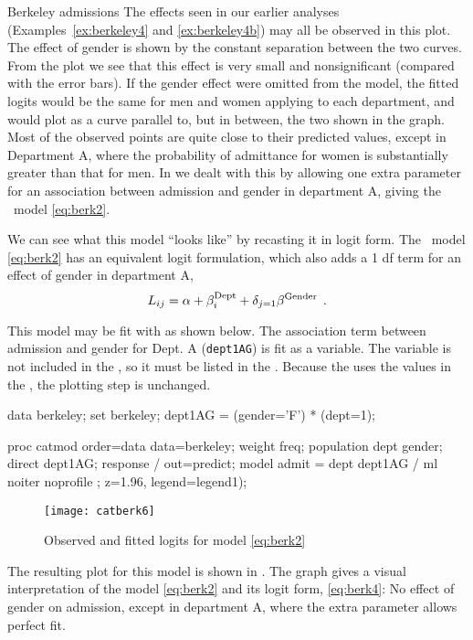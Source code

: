 \begin{Example}[berkeley8]{Berkeley admissions}
The effects seen in our earlier analyses (Examples~\ref{ex:berkeley4}
and \ref{ex:berkeley4b})
may all be observed in this
plot.
The effect of gender is shown by the constant separation
between the two curves.
From the plot we see that this effect is very small and nonsignificant (compared
with the error bars).
If the gender effect were omitted from the model,
the fitted logits would be the same
for men and women applying to each department, and would plot as a curve
parallel to, but in between, the two shown in the graph.
Most of the observed points are quite close to their predicted values,
except in Department A,
where the probability of admittance for women is substantially
greater than that for men.
In  we dealt with this by allowing one extra parameter
for an association between admission and gender in department A,
giving the \loglin\ model \eqref{eq:berk2}.

We can see what this model ``looks like'' by recasting it in logit form.
The \loglin\ model \eqref{eq:berk2}
has an equivalent logit formulation, which also adds a 1 df term for an
effect of gender in department A,
\begin{equation}\label{eq:berk4}
  L_{ij} =
  \alpha   +  \beta _i^{\mbox{\scriptsize Dept}}
  +  \delta_{j=1} \beta^{\mbox{\scriptsize Gender}}
  \:\: .
\end{equation}

This model may be fit
with  as shown below.  The association term between admission
and gender for Dept. A (\texttt{dept1AG}) is fit as a 
variable.  The  variable is not included in the
, so it must be listed in the
.
Because the 
uses the values in the \ODS, the plotting step is unchanged.

\begin{listing}
data berkeley;
   set berkeley;
   dept1AG = (gender='F') * (dept=1);

proc catmod order=data
            data=berkeley;
   weight freq;
   population dept gender;
   direct dept1AG;
   response / out=predict;
   model admit = dept dept1AG / ml noiter noprofile ;
   z=1.96, legend=legend1);
\end{listing}

\begin{figure}[htb]
  \centering
  \texttt{[image: catberk6]}
  \caption{Observed and fitted logits for model \eqref{eq:berk2}}%
  \label{fig:catberk6}
\end{figure}
The resulting plot for this model is shown in .
The graph gives a visual interpretation of the model
\eqref{eq:berk2} and its logit form, \eqref{eq:berk4}:
No effect of gender on admission, except in department A, where the
extra parameter allows perfect fit.
\end{Example}
